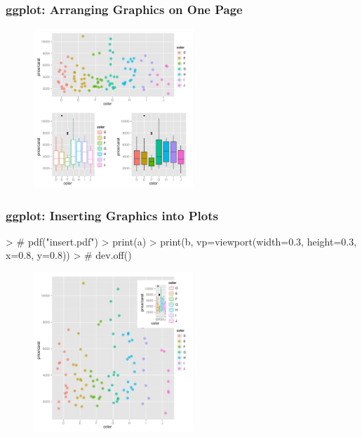 \documentclass{beamer}
\begin{document}
\begin{frame}[containsverbatim]  
	\frametitle{ggplot: Arranging Graphics on One Page}
\vspace{0cm}
\begin{figure}[htbp]
\begin{center}
        \includegraphics[height=6cm, width=6cm]{arrange.pdf} \\
\end{center}
\end{figure}
\end{frame}
\begin{frame}[containsverbatim]  
	\frametitle{ggplot: Inserting Graphics into Plots}
\vspace{0cm}
\tiny
\begin{Schunk}
\begin{Sinput}
> # pdf("insert.pdf")
> print(a)
> print(b, vp=viewport(width=0.3, height=0.3, x=0.8, y=0.8))
> # dev.off()
\end{Sinput}
\end{Schunk}
\begin{figure}[htbp]
\begin{center}
        \includegraphics[height=6cm, width=6cm]{insert.pdf} \\
\end{center}
\end{figure}
\end{frame}
\end{document}
